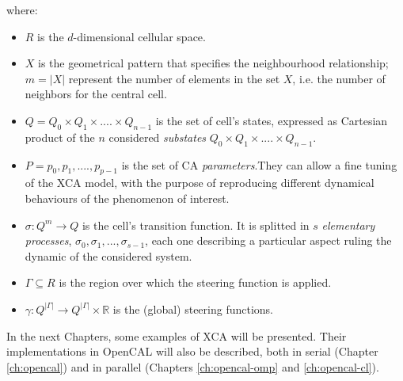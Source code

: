 \noindent where:

\begin{itemize}

\item $R$ is the $d$-dimensional cellular space.

\item $X$ is the geometrical pattern that specifies the neighbourhood
  relationship; $m = |X|$ represent the number of elements in the set
  $X$, i.e. the number of neighbors for the central cell.

\item $Q = Q_0 \times Q_1 \times....\times Q_{n-1}$ is the set of
  cell's states, expressed as Cartesian product of the $n$ considered
  \emph{substates} $Q_0 \times Q_1 \times....\times Q_{n-1}$.

\item $P = {p_0,p_1,....,p_{p-1}}$ is the set of CA
  \emph{parameters}.They can allow a fine tuning of the XCA model,
  with the purpose of reproducing different dynamical behaviours of
  the phenomenon of interest.

\item $\sigma : Q^m \rightarrow Q$ is the cell's transition function.
 It is splitted in $s$ \emph{elementary processes}, $\sigma_0,\sigma_1, ...,
  \sigma_{s-1}$, each one describing a particular aspect ruling the
  dynamic of the considered system.

\item $\Gamma \subseteq R$ is the region  over which the steering
  function is applied.

\item $\gamma: Q^{|\Gamma|} \rightarrow Q^{|\Gamma|} \times
  \mathbb{R}$ is the (global) steering functions.

\end{itemize}

In the next Chapters, some examples of XCA will be presented. Their
implementations in OpenCAL will also be described, both in serial
(Chapter \ref{ch:opencal}) and in parallel (Chapters
\ref{ch:opencal-omp} and \ref{ch:opencal-cl}).

